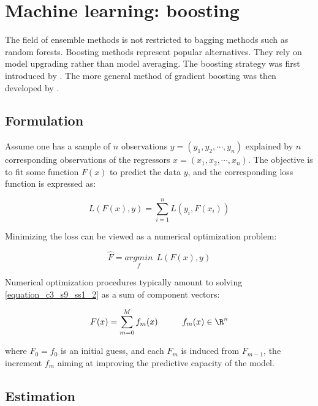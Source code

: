 \section{Machine learning: boosting}
\label{chapter3_section9}

The field of ensemble methods is not restricted to bagging methods such as random forests. Boosting methods represent popular alternatives. They rely on model upgrading rather than model averaging. The boosting strategy was first introduced by \cite{Freund1997}. The more general method of gradient boosting was then developed by \cite{Friedman2001}.

\subsection{Formulation}
\label{chapter3_section9_subsection1}

Assume one has a sample of $n$ observations $y = (y_1, y_2, \cdots, y_n)$ explained by $n$ corresponding observations of the regressors $x = (x_1, x_2, \cdots, x_n)$. The objective is to fit some function $F(x)$ to predict the data $y$, and the corresponding loss function is expressed as:

\begin{equation}
L(F(x),y) = \sum_{i=1}^{n}{L(y_i, F(x_i))}
\label{equation_c3_s9_ss1_1} 
\end{equation}

Minimizing the loss can be viewed as a numerical optimization problem:

\begin{equation}
\hat{F} = \underset{f}{argmin} \ \ L(F(x),y)
\label{equation_c3_s9_ss1_2} 
\end{equation}

Numerical optimization procedures typically amount to solving \ref{equation_c3_s9_ss1_2} as a sum of component vectors:

\begin{equation}
F(x) = \sum_{m=0}^{M}{f_m(x)} \hspace{10mm} f_m(x) \in \R^n
\label{equation_c3_s9_ss1_3} 
\end{equation}

where $F_0 = f_0$ is an initial guess, and each $F_m$ is induced from $F_{m-1}$, the increment $f_m$ aiming at improving the predictive capacity of the model.

\newpage


\subsection{Estimation}
\label{chapter3_section9_subsection2}


